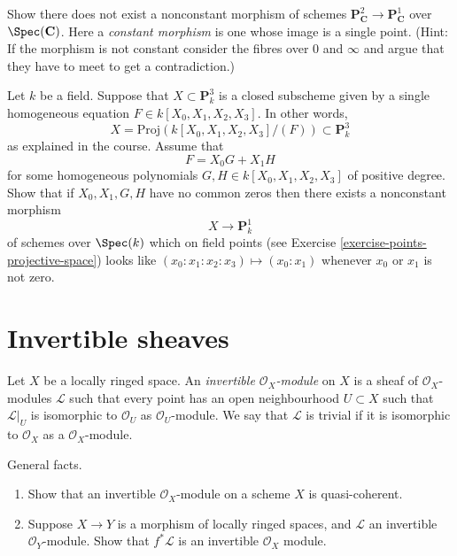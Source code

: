 \begin{exercise}
\label{exercise-no-nonconstant-morphism-proj}
Show there does not exist a nonconstant morphism of schemes
$\mathbf{P}^2_{\mathbf{C}} \to \mathbf{P}^1_{\mathbf{C}}$
over $\Spec(\mathbf{C})$. Here a {\it constant morphism} is
one whose image is a single point.
(Hint: If the morphism is not constant consider the fibres over
$0$ and $\infty$ and argue that they have to meet to get a contradiction.)
\end{exercise}

\begin{exercise}
\label{exercise-nonconstant-morphism}
Let $k$ be a field.
Suppose that $X \subset \mathbf{P}^3_k$ is a closed subscheme
given by a single homogeneous equation $F \in k[X_0, X_1, X_2, X_3]$.
In other words,
$$
X = \text{Proj}(k[X_0, X_1, X_2, X_3]/(F)) \subset \mathbf{P}^3_k
$$
as explained in the course. Assume that
$$
F = X_0 G + X_1 H
$$
for some homogeneous polynomials $G, H \in k[X_0, X_1, X_2, X_3]$
of positive degree. Show that if $X_0, X_1, G, H$ have no common zeros
then there exists a nonconstant morphism
$$
X \longrightarrow \mathbf{P}^1_k
$$
of schemes over $\Spec(k)$
which on field points (see Exercise \ref{exercise-points-projective-space})
looks like $(x_0 : x_1 : x_2 : x_3) \mapsto (x_0 : x_1)$ whenever
$x_0$ or $x_1$ is not zero.
\end{exercise}





\section{Invertible sheaves}
\label{section-invertible-sheaves}

\begin{definition}
\label{definition-invertible-sheaf}
Let $X$ be a locally ringed space.
An {\it invertible ${\mathcal O}_X$-module} on $X$
is a sheaf of ${\mathcal O}_X$-modules ${\mathcal L}$ such that every point
has an open neighbourhood $U \subset X$ such that ${\mathcal L}|_U$
is isomorphic to ${\mathcal O}_U$ as ${\mathcal O}_U$-module.
We say that ${\mathcal L}$ is trivial if it is isomorphic to
${\mathcal O}_X$ as a ${\mathcal O}_X$-module.
\end{definition}

\begin{exercise}
\label{exercise-general-facts-invertible}
General facts.
\begin{enumerate}
\item Show that an invertible ${\mathcal O}_X$-module on
a scheme $X$ is quasi-coherent.
\item Suppose $X\to Y$ is a morphism of locally ringed spaces,
and ${\mathcal L}$ an invertible ${\mathcal O}_Y$-module.
Show that $f^\ast {\mathcal L}$ is an invertible ${\mathcal O}_X$ module.
\end{enumerate}
\end{exercise}

